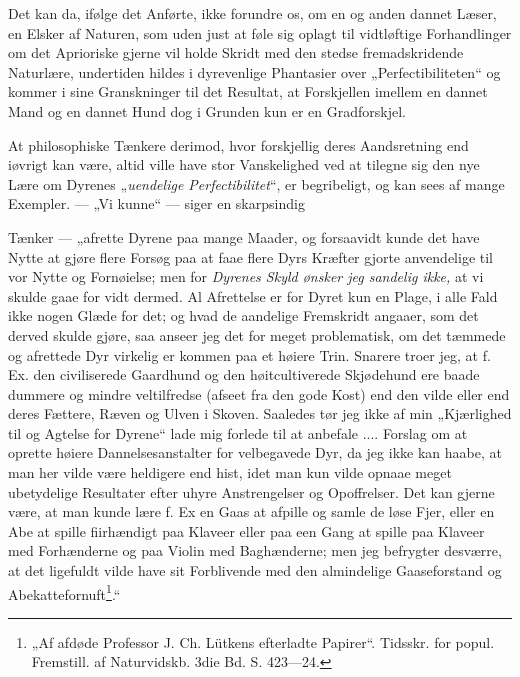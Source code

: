 \documentclass[12pt,a4paper]{book}
\begin{document}
Det kan da, ifølge det Anførte, ikke forundre os, om en og anden dannet Læser,
en Elsker af Naturen, som uden just at føle sig oplagt til vidtløftige
Forhandlinger om det Aprioriske gjerne vil holde Skridt med den stedse
fremadskridende Naturlære, undertiden hildes i dyrevenlige Phantasier over
„Perfectibiliteten“ og kommer i sine Granskninger til det Resultat, at
Forskjellen imellem en dannet Mand og en dannet Hund dog i Grunden kun er en
Gradforskjel.

At philosophiske Tænkere derimod, hvor forskjellig deres Aandsretning end
iøvrigt kan være, altid ville have stor Vanskelighed ved at tilegne sig den nye
Lære om Dyrenes „\emph{uendelige Perfectibilitet}“, er begribeligt, og kan sees
af mange Exempler. --- „Vi kunne“ --- siger en skarpsindig

\setcounter{footnote}{0}
Tænker --- „afrette Dyrene paa mange Maader, og forsaavidt kunde det have Nytte
at gjøre flere Forsøg paa at faae flere Dyrs Kræfter gjorte anvendelige til vor
Nytte og Fornøielse; men for \emph{Dyrenes Skyld ønsker jeg sandelig ikke,} at
vi skulde gaae for vidt dermed. Al Afrettelse er for Dyret kun en Plage, i alle
Fald ikke nogen Glæde for det; og hvad de aandelige Fremskridt angaaer, som det
derved skulde gjøre, saa anseer jeg det for meget problematisk, om det tæmmede
og afrettede Dyr virkelig er kommen paa et høiere Trin. Snarere troer jeg, at
f. Ex. den civiliserede Gaardhund og den høitcultiverede Skjødehund ere baade
dummere og mindre veltilfredse (afseet fra den gode Kost) end den vilde eller
end deres Fættere, Ræven og Ulven i Skoven. Saaledes tør jeg ikke af min
„Kjærlighed til og Agtelse for Dyrene“ lade mig forlede til at anbefale ....
Forslag om at oprette høiere Dannelsesanstalter for velbegavede Dyr, da jeg ikke
kan haabe, at man her vilde være heldigere end hist, idet man kun vilde opnaae
meget ubetydelige Resultater efter uhyre Anstrengelser og Opoffrelser. Det kan
gjerne være, at man kunde lære f. Ex en Gaas at afpille og samle de løse Fjer,
eller en Abe at spille fiirhændigt paa Klaveer eller paa een Gang at spille paa
Klaveer med Forhænderne og paa Violin med Baghænderne; men jeg befrygter
desværre, at det ligefuldt vilde have sit Forblivende med den almindelige
Gaaseforstand og Abekattefornuft\footnote{„Af afdøde Professor J. Ch. Lütkens
efterladte Papirer“. Tidsskr. for popul. Fremstill. af Naturvidskb. 3die Bd.
S. 423---24.}.“
\end{document}
